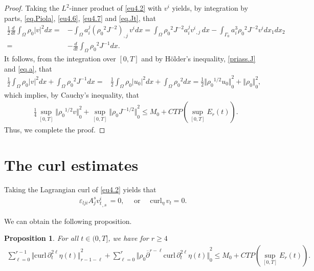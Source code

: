 \documentclass[12pt,twoside,reqno]{amsart}
\numberwithin{equation}{section}
\newtheorem{proposition}[theorem]{Proposition}
\theoremstyle{definition}
\theoremstyle{remark}
\begin{document}
\begin{proof}
Taking the $L^2$-inner product of \eqref{eu4.2} with $v^i$ yields, by integration by parts, \eqref{eq.Piola}, \eqref{eu4.6}, \eqref{eu4.7}  and \eqref{eq.Jt}, that
\begin{align*}
 \frac{1}{2}\frac{d}{dt} \int_\Omega{\rho_0} |v|^2dx
 =&-\int_\Omega a^j_i{{{\left({\rho_0}^2  J^{-2}\right)}}_{,{j}}\,}v^idx
 =\int_\Omega{\rho_0}^2  J^{-2}a^j_i{{{v^i}}_{,{j}}\,}dx -\int_{\Gamma_0} a^3_i{\rho_0}^2  J^{-2}v^idx_1dx_2\\
 =&- \frac{d}{dt}\int_\Omega {\rho_0}^2 J^{-1}dx.
\end{align*}
It follows, from the integration over $[0,T]$ and by H\"older's inequality, \eqref{priass.J} and \eqref{eq.a}, that
\begin{align*}
\frac{1}{2}\int_\Omega{\rho_0} |v|^2dx+ \int_\Omega {\rho_0}^2 J^{-1}dx
  =&\frac{1}{2}\int_\Omega{\rho_0} |u_0|^2dx+ \int_\Omega {\rho_0}^2 dx
  =\frac{1}{2}{\Vert{{\rho_0}^{1/2}u_0}\Vert}_0^2 + {\Vert{\rho_0}\Vert}_0^2,
\end{align*}
which implies, by Cauchy's inequality, that
\begin{align*}
  &\frac{1}{4}\sup_{[0,T]}{\Vert{{\rho_0}^{1/2}v}\Vert}_0^2+ \sup_{[0,T]}{\Vert{{\rho_0}  J^{-1/2}}\Vert}_0^2
  {\leqslant} M_0+CTP(\sup_{[0,T]}E_r(t)).
\end{align*}
Thus, we complete the proof.
\end{proof}

\section{The curl estimates}\label{sec.6}

Taking the Lagrangian curl of \eqref{eu4.2} yields  that
\begin{align}\label{eq.curletavt0}
   {\varepsilon}_{lji}A_j^s{{{v_t^i}}_{,{s}}\,}=0, \quad\text{ or }\quad {\mathrm{curl}_\eta\,} v_t=0.
\end{align}

We can obtain the following proposition.

\begin{proposition}\label{prop.curl}
  For all $t\in(0,T]$, we have for $r{\geqslant} 4$
\begin{align}
    \sum_{\ell=0}^{r-1}{\Vert{{\mathrm{curl}\,}{\partial}_t^{2\ell} \eta(t)}\Vert}_{r-1-\ell}^2+\sum_{\ell=0}^r{\Vert{{\rho_0}  {\overline{\partial}}^{r-\ell}{\mathrm{curl}\,}{\partial}_t^{2\ell} \eta(t)}\Vert}_0^2
    {\leqslant} M_0+CTP(\sup_{[0,T]}E_r(t)).\label{eq.curl.1}
\end{align}
\end{proposition}
\end{document}
